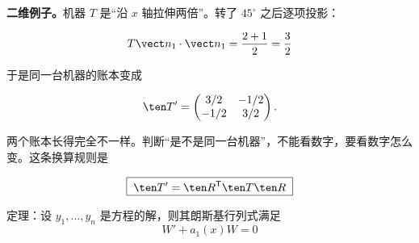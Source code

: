 \documentclass{article}
\begin{document}

\textbf{二维例子。}机器 $T$ 是“沿 $x$ 轴拉伸两倍”。转了 $45^\circ$ 之后逐项投影：

\[
T\vect n_1\cdot\vect n_1=\frac{2+1}{2}=\frac32
\]

于是同一台机器的账本变成

\[
\ten T'=\begin{pmatrix}3/2&-1/2\\-1/2&3/2\end{pmatrix}.
\]

两个账本长得完全不一样。判断“是不是同一台机器”，不能看数字，要看数字怎么变。这条换算规则是

\[
\boxed{\;\ten T'=\ten R^{\mathsf T}\ten T\ten R\;}
\]


\begin{center}
定理：设 $y_1,\dots,y_n$ 是方程的解，则其朗斯基行列式满足
\[
\boxed{\;W'+a_1(x)W=0\;}
\]
\end{center}
\end{document}
